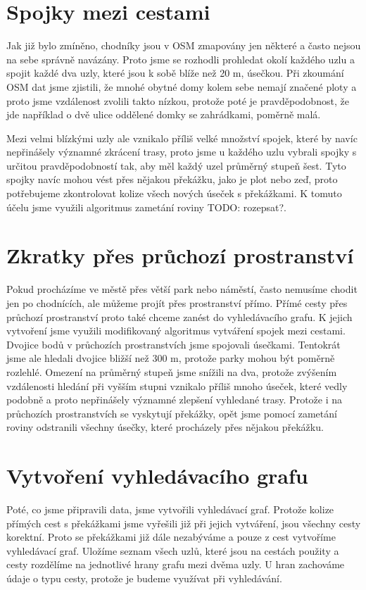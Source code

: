 \section{Spojky mezi cestami}
Jak již bylo zmíněno, chodníky jsou v OSM zmapovány jen některé a často nejsou
na sebe správně navázány. Proto jsme se rozhodli prohledat okolí každého uzlu a
spojit každé dva uzly, které jsou k sobě blíže než 20 m, úsečkou. Při zkoumání
OSM dat jsme zjistili, že mnohé obytné domy kolem sebe nemají značené ploty a
proto jsme vzdálenost zvolili takto nízkou, protože poté je pravděpodobnost, že
jde například o dvě ulice oddělené domky se zahrádkami, poměrně malá.  

Mezi velmi blízkými uzly ale vznikalo příliš velké množství spojek, které by
navíc nepřinášely významné zkrácení trasy, proto jsme u každého uzlu vybrali
spojky s určitou pravděpodobností tak, aby měl každý uzel průměrný stupeň šest.
Tyto spojky navíc mohou vést přes nějakou překážku, jako je plot nebo zeď, proto
potřebujeme zkontrolovat kolize všech nových úseček s překážkami. K tomuto účelu
jsme využili algoritmus zametání roviny TODO: rozepsat?.  

\section{Zkratky přes průchozí prostranství}
Pokud procházíme ve městě přes větší park nebo náměstí, často nemusíme chodit
jen po chodnících, ale můžeme projít přes prostranství přímo. Přímé cesty přes
průchozí prostranství proto také chceme zanést do vyhledávacího grafu. K jejich
vytvoření jsme využili modifikovaný algoritmus vytváření spojek mezi cestami.
Dvojice bodů v průchozích prostranstvích jsme spojovali úsečkami. Tentokrát jsme
ale hledali dvojice bližší než 300 m, protože parky mohou být poměrně rozlehlé.
Omezení na průměrný stupeň jsme snížili na dva, protože zvýšením vzdálenosti
hledání při vyšším stupni vznikalo příliš mnoho úseček, které vedly podobně a
proto nepřinášely významné zlepšení vyhledané trasy. Protože i na průchozích
prostranstvích se vyskytují překážky, opět jsme pomocí zametání roviny
odstranili všechny úsečky, které procházely přes nějakou překážku.

\section{Vytvoření vyhledávacího grafu}
Poté, co jsme připravili data, jsme vytvořili vyhledávací graf. Protože kolize
přímých cest s překážkami jsme vyřešili již při jejich vytváření, jsou všechny
cesty korektní. Proto se překážkami již dále nezabýváme a pouze z cest vytvoříme
vyhledávací graf. Uložíme seznam všech uzlů, které jsou na cestách použity a
cesty rozdělíme na jednotlivé hrany grafu mezi dvěma uzly. U hran zachováme
údaje o typu cesty, protože je budeme využívat při vyhledávání.
